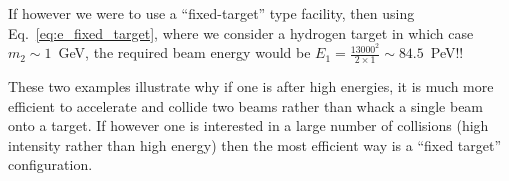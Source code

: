 If however we were to use a ``fixed-target'' type facility, then using Eq.~\ref{eq:e_fixed_target}, where we consider a hydrogen target in which case $m_{2}\sim 1$~GeV, the required beam energy would be $E_{1}=\frac{13000^2}{2\times1}\sim84.5$~PeV!!

These two examples illustrate why if one is after high energies, it is much more efficient to accelerate and collide two beams rather than whack a single beam onto a target. If however one is interested in a large number of collisions (high intensity rather than high energy) then the most efficient way is a ``fixed target'' configuration.

